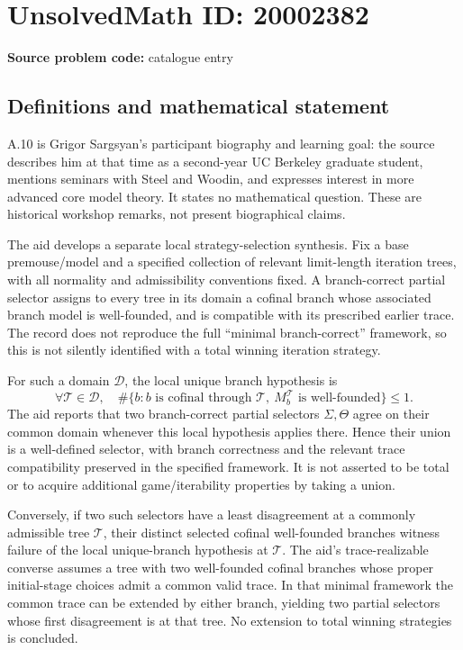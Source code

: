 \documentclass[11pt]{article}
\begin{document}
\section*{UnsolvedMath ID: 20002382}
\textbf{Source problem code:} catalogue entry
\subsection{Definitions and mathematical statement}
A.10 is Grigor Sargsyan's participant biography and learning goal: the source describes him at that time as a second-year UC Berkeley graduate student, mentions seminars with Steel and Woodin, and expresses interest in more advanced core model theory. It states no mathematical question. These are historical workshop remarks, not present biographical claims.

The aid develops a separate local strategy-selection synthesis. Fix a base premouse/model and a specified collection of relevant limit-length iteration trees, with all normality and admissibility conventions fixed. A branch-correct partial selector assigns to every tree in its domain a cofinal branch whose associated branch model is well-founded, and is compatible with its prescribed earlier trace. The record does not reproduce the full ``minimal branch-correct'' framework, so this is not silently identified with a total winning iteration strategy.

For such a domain \(\mathcal D\), the local unique branch hypothesis is
\[
 \forall\mathcal T\in\mathcal D,\quad
 \#\{b:b\text{ is cofinal through }\mathcal T,
 \ M_b^{\mathcal T}\text{ is well-founded}\}\le1.
\]
The aid reports that two branch-correct partial selectors \(\Sigma,\Theta\) agree on their common domain whenever this local hypothesis applies there. Hence their union is a well-defined selector, with branch correctness and the relevant trace compatibility preserved in the specified framework. It is not asserted to be total or to acquire additional game/iterability properties by taking a union.

Conversely, if two such selectors have a least disagreement at a commonly admissible tree \(\mathcal T\), their distinct selected cofinal well-founded branches witness failure of the local unique-branch hypothesis at \(\mathcal T\). The aid's trace-realizable converse assumes a tree with two well-founded cofinal branches whose proper initial-stage choices admit a common valid trace. In that minimal framework the common trace can be extended by either branch, yielding two partial selectors whose first disagreement is at that tree. No extension to total winning strategies is concluded.
\end{document}
